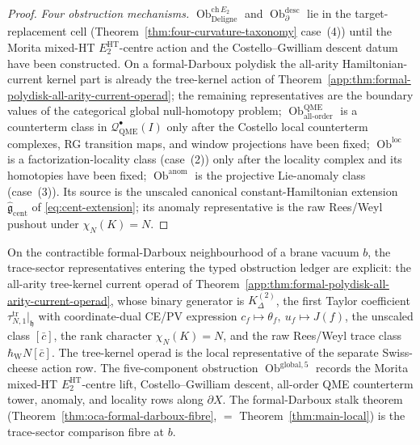 \begin{proof}
\emph{Four obstruction mechanisms.}
\(\operatorname{Ob}^{\mathrm{ch}\,E_2}_{\mathrm{Deligne}}\) and
\(\operatorname{Ob}^{\mathrm{desc}}_{\partial}\) lie in the
target-replacement cell
(Theorem~\ref{thm:four-curvature-taxonomy} case~(4)) until the Morita
mixed-HT \(E_2^{\mathrm{HT}}\)-centre action and the Costello--Gwilliam descent
datum have been constructed.  On a formal-Darboux polydisk the all-arity
Hamiltonian-current kernel part is already the tree-kernel action of
Theorem~\ref{app:thm:formal-polydisk-all-arity-current-operad}; the
remaining representatives are the boundary values of the categorical
global null-homotopy problem;
\(\operatorname{Ob}^{\mathrm{QME}}_{\mathrm{all\mbox{-}order}}\) is a
counterterm class in \(\mathcal Q^\bullet_{\mathrm{QME}}(I)\) only after
the Costello local counterterm complexes, RG transition maps, and window
projections have been fixed; \(\operatorname{Ob}^{\mathrm{loc}}\) is a
factorization-locality class (case~(2)) only after the locality complex
and its homotopies have been fixed;
\(\operatorname{Ob}^{\mathrm{anom}}\) is the projective Lie-anomaly
class (case~(3)).  Its source is the unscaled canonical
constant-Hamiltonian extension
\(\widehat{\mathfrak g}_{\mathrm{cent}}\) of
\eqref{eq:cent-extension}; its anomaly representative is the raw
Rees/Weyl pushout under \(\chi_N(K)=N\).
\end{proof}

\begin{rmk}
\label{rmk:local-trivialisation-five-component-obstruction}
On the contractible formal-Darboux neighbourhood of a brane vacuum
\(b\), the trace-sector representatives entering the typed obstruction
ledger are explicit: the all-arity tree-kernel current operad of
Theorem~\ref{app:thm:formal-polydisk-all-arity-current-operad}, whose
binary generator is \(K^{(2)}_\Delta\), the first Taylor coefficient
\(\tau_{N,1}^{\mathrm{tr}}|_{\mathfrak h}\) with coordinate-dual CE/PV expression
\(c_f\mapsto\theta_f,\ u_f\mapsto J(f)\), the unscaled class
\([\bar c]\), the rank character \(\chi_N(K)=N\), and the raw Rees/Weyl
trace class \(\hbar_{\mathrm W}N[\bar c]\).  The tree-kernel operad is the local representative of the
separate Swiss-cheese action row.  The five-component obstruction
\(\operatorname{Ob}^{\mathrm{global},5}\) records the Morita mixed-HT
\(E_2^{\mathrm{HT}}\)-centre lift, Costello--Gwilliam descent, all-order QME
counterterm tower, anomaly, and locality rows along \(\partial X\).  The
formal-Darboux stalk theorem (Theorem~\ref{thm:oca-formal-darboux-fibre},
\(=\) Theorem~\ref{thm:main-local}) is the trace-sector comparison
fibre at \(b\).
\end{rmk}

